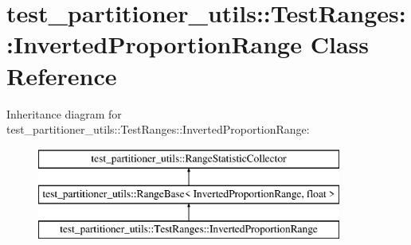 \hypertarget{classtest__partitioner__utils_1_1TestRanges_1_1InvertedProportionRange}{}\section{test\+\_\+partitioner\+\_\+utils\+:\+:Test\+Ranges\+:\+:Inverted\+Proportion\+Range Class Reference}
\label{classtest__partitioner__utils_1_1TestRanges_1_1InvertedProportionRange}
Inheritance diagram for test\+\_\+partitioner\+\_\+utils\+:\+:Test\+Ranges\+:\+:Inverted\+Proportion\+Range\+:\begin{figure}[H]
\begin{center}
\leavevmode
\includegraphics[height=3.000000cm]{classtest__partitioner__utils_1_1TestRanges_1_1InvertedProportionRange}
\end{center}
\end{figure}
